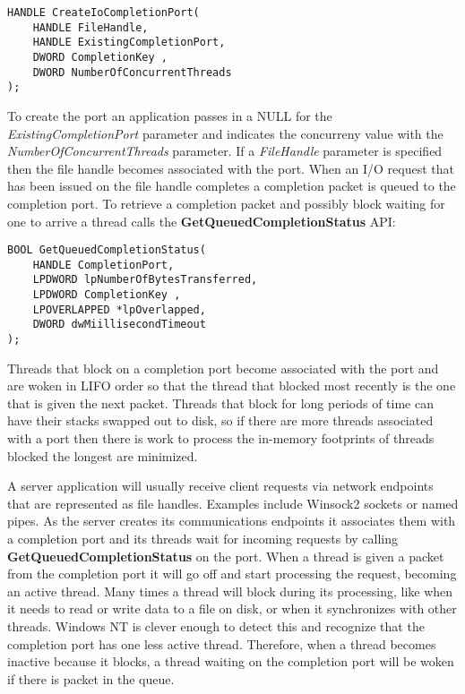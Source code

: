 \documentclass[a4paper,12pt,notitlepage,twoside,openright]{article}
\begin{document}
\begin{verbatim}
HANDLE CreateIoCompletionPort(
    HANDLE FileHandle,
    HANDLE ExistingCompletionPort,
    DWORD CompletionKey ,
    DWORD NumberOfConcurrentThreads
);
\end{verbatim}

To create the port an application passes in a NULL for the \emph{ExistingCompletionPort} parameter and indicates the concurreny value with the \emph{NumberOfConcurrentThreads} parameter. If a \emph{FileHandle} parameter is specified then the file handle becomes associated with the port. When an I/O request that has been issued on the file handle completes a completion packet is queued to the completion port. To retrieve a completion packet and possibly block waiting for one to arrive a thread calls the \textbf{GetQueuedCompletionStatus} API:

\begin{verbatim}
BOOL GetQueuedCompletionStatus(
    HANDLE CompletionPort,
    LPDWORD lpNumberOfBytesTransferred,
    LPDWORD CompletionKey ,
    LPOVERLAPPED *lpOverlapped,
    DWORD dwMiillisecondTimeout
);
\end{verbatim}

Threads that block on a completion port become associated with the port and are woken in LIFO order so that the thread that blocked most recently is the one that is given the next packet. Threads that block for long periods of time can have their stacks swapped out to disk, so if there are more threads associated with a port then there is work to process the in-memory footprints of threads blocked the longest are minimized.

A server application will usually receive client requests via network endpoints that are represented as file handles. Examples include Winsock2 sockets or named pipes. As the server creates its communications endpoints it associates them with a completion port and its threads wait for incoming requests by calling \textbf{GetQueuedCompletionStatus} on the port. When a thread is given a packet from the completion port it will go off and start processing the request, becoming an active thread. Many times a thread will block during its processing, like when it needs to read or write data to a file on disk, or when it synchronizes with other threads. Windows NT is clever enough to detect this and recognize that the completion port has one less active thread. Therefore, when a thread becomes inactive because it blocks, a thread waiting on the completion port will be woken if there is packet in the queue.
\end{document}
